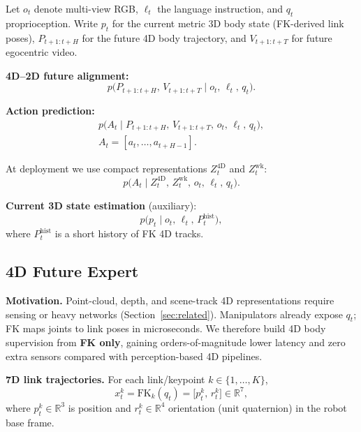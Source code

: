 \documentclass[journal]{IEEEtran}
\begin{document}
Let $o_t$ denote multi-view RGB, $\ell_t$ the language instruction, and
$q_t$ proprioception. Write $p_t$ for the current metric 3D body state
(FK-derived link poses), $P_{t+1:t+H}$ for the future 4D body
trajectory, and $V_{t+1:t+T}$ for future egocentric video.

\textbf{4D--2D future alignment:}
\begin{equation}
p\bigl(P_{t+1:t+H},\, V_{t+1:t+T} \mid o_t,\, \ell_t,\, q_t\bigr).
\label{eq:align}
\end{equation}

\textbf{Action prediction:}
\begin{multline}
p\bigl(A_t \mid P_{t+1:t+H},\, V_{t+1:t+T},\, o_t,\, \ell_t,\, q_t\bigr),\\
A_t = [a_t, \ldots, a_{t+H-1}].
\label{eq:action}
\end{multline}

At deployment we use compact representations $Z^{\mathrm{4D}}_t$ and
$Z^{\mathrm{wk}}_t$:
\begin{equation}
p\bigl(A_t \mid Z^{\mathrm{4D}}_t,\, Z^{\mathrm{wk}}_t,\, o_t,\, \ell_t,\, q_t\bigr).
\label{eq:action-deploy}
\end{equation}

\textbf{Current 3D state estimation} (auxiliary):
\begin{equation}
p\bigl(p_t \mid o_t,\, \ell_t,\, P^{\mathrm{hist}}_t\bigr),
\label{eq:cur}
\end{equation}
where $P^{\mathrm{hist}}_t$ is a short history of FK 4D tracks.

\subsection{4D Future Expert}
\label{sec:4d}

\textbf{Motivation.} Point-cloud, depth, and scene-track 4D
representations require sensing or heavy networks
(Section~\ref{sec:related}). Manipulators already expose $q_t$; FK maps
joints to link poses in microseconds. We therefore build 4D body
supervision from \textbf{FK only}, gaining orders-of-magnitude lower
latency and zero extra sensors compared with perception-based 4D
pipelines.

\textbf{7D link trajectories.} For each link/keypoint
$k \in \{1,\ldots,K\}$,
\begin{equation}
x^k_t = \mathrm{FK}_k(q_t) = \bigl[p^k_t,\, r^k_t\bigr] \in \mathbb{R}^7,
\label{eq:fk7d}
\end{equation}
where $p^k_t \in \mathbb{R}^3$ is position and
$r^k_t \in \mathbb{R}^4$ orientation (unit quaternion) in the robot base
frame.
\end{document}

